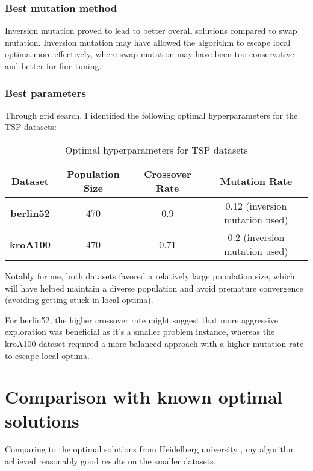 \documentclass[11pt]{scrartcl} %
\begin{document}
\subsubsection{Best mutation method}
Inversion mutation proved to lead to better overall solutions compared to swap mutation. Inversion mutation may have allowed the algorithm to escape local optima more effectively, where swap mutation may have been too conservative and better for fine tuning.

\subsubsection{Best parameters}
Through grid search, I identified the following optimal hyperparameters for the TSP datasets:

\begin{table}[h!]
	\centering
	\begin{tabular}{|c|c|c|c|}
	\hline
	\textbf{Dataset} & \textbf{Population Size} & \textbf{Crossover Rate} & \textbf{Mutation Rate} \\ \hline
	\textbf{berlin52} & 470 & 0.9 & 0.12 (inversion mutation used) \\ \hline
	\textbf{kroA100} & 470 & 0.71 & 0.2 (inversion mutation used) \\ \hline
	\end{tabular}
	\caption{Optimal hyperparameters for TSP datasets}
	\label{tab:optimal_params}
\end{table}

Notably for me, both datasets favored a relatively large population size, which will have helped maintain a diverse population and avoid premature convergence (avoiding getting stuck in local optima). 

For berlin52, the higher crossover rate might suggest that more aggressive exploration was beneficial as it's a smaller problem instance, whereas the kroA100 dataset required a more balanced approach with a higher mutation rate to escape local optima.


\section{Comparison with known optimal solutions}
\label{Comparison with known optimal solutions}

Comparing to the optimal solutions from Heidelberg university \cite{heidelberg_university_best_known}, my algorithm achieved reasonably good results on the smaller datasets.
\end{document}
